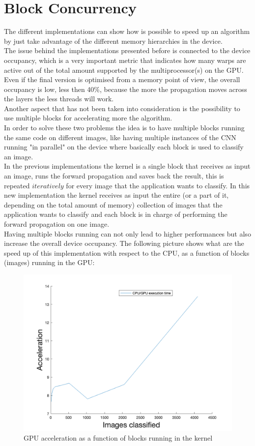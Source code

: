 \documentclass[a4paper]{report}
\begin{document}
\section{Block Concurrency}
The different implementations can show how is possible to speed up an algorithm by just take advantage of the different memory hierarchies in the device.\\
The issue behind the implementations presented before is connected to the device occupancy, which is a very important metric that indicates how many warps are active out of the total amount supported by the multiprocessor(s) on the GPU.
Even if the final version is optimised from a memory point of view, the overall occupancy is low, less then 40\%, because the more the propagation moves across the layers the less threads will work.\\
Another aspect that has not been taken into consideration is the possibility to use multiple blocks for accelerating more the algorithm.\\
In order to solve these two problems the idea is to have multiple blocks running the same code on different images, like having multiple instances of the CNN running "in parallel" on the device where basically each block is used to classify an image.\\
In the previous implementations the kernel is a single block that receives as input an image, runs the forward propagation and saves back the result, this is repeated \(iteratively\) for every image that the application wants to classify. In this new implementation the kernel receives as input the entire (or a part of it, depending on the total amount of memory) collection of images that the application wants to classify and each block is in charge of performing the forward propagation on one image.\\
Having multiple blocks running can not only lead to higher performances but also increase the overall device occupancy.
The following picture shows what are the speed up of this implementation with respect to the CPU, as a function of blocks (images) running in the GPU:
\begin{figure}[!h]
\centering
\includegraphics[scale=0.3]{docs/blocks_results.png} 
\caption{GPU acceleration as a function of blocks running in the kernel}
\label{fig_gpu5}
\end{figure}
\end{document}
